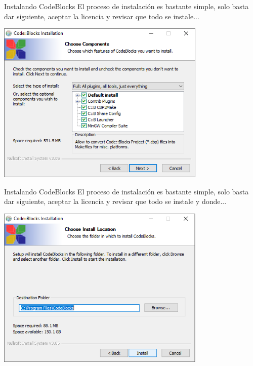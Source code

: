 \documentclass[11pt]{beamer}
\begin{document}
\begin{frame}{Instalando CodeBlocks}
    \justifying
    El proceso de instalación es bastante simple, solo basta dar siguiente, aceptar la licencia y revisar que todo se instale...
    
    \centering
    \includegraphics[width=0.75\textwidth]{cb19.png}
\end{frame}
\begin{frame}{Instalando CodeBlocks}
    \justifying
    El proceso de instalación es bastante simple, solo basta dar siguiente, aceptar la licencia y revisar que todo se instale y donde...
    
    \centering
    \includegraphics[width=0.75\textwidth]{cb10.png}
\end{frame}
\end{document}

